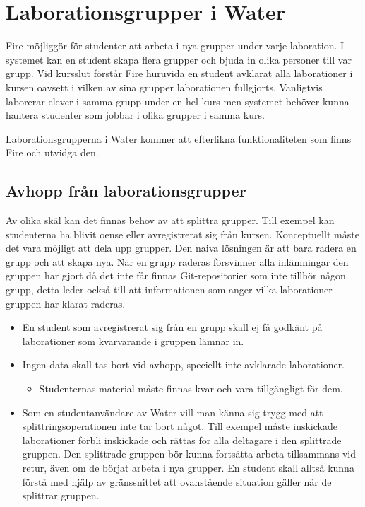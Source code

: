 \section{Laborationsgrupper i Water}

Fire möjliggör för studenter att arbeta i nya grupper under varje laboration. I systemet kan en student skapa flera grupper och bjuda in olika personer till var grupp. Vid kursslut förstår Fire huruvida en student avklarat alla laborationer i kursen oavsett i vilken av sina grupper laborationen fullgjorts. Vanligtvis laborerar elever i samma grupp under en  hel kurs men systemet behöver kunna hantera studenter som jobbar i olika grupper i samma kurs.

Laborationsgrupperna i Water kommer att efterlikna funktionaliteten som finns Fire och utvidga den.

\subsection{Avhopp från laborationsgrupper}

Av olika skäl kan det finnas behov av att splittra grupper.  Till exempel kan
studenterna ha blivit oense eller avregistrerat sig från kursen. Konceptuellt
måste det vara möjligt att dela upp grupper. Den naiva lösningen är att bara
radera en grupp och att skapa nya. När en grupp raderas försvinner alla
inlämningar den gruppen har gjort då det inte får finnas Git-repositorier som
inte tillhör någon grupp, detta leder också till att informationen som anger
vilka laborationer gruppen har klarat raderas.

\begin{itemize}
  \item En student som avregistrerat sig från en grupp skall ej få godkänt på laborationer som kvarvarande i gruppen lämnar in.
  \item Ingen data skall tas bort vid avhopp, speciellt inte avklarade laborationer.
  \begin{itemize}
    \item Studenternas material måste finnas kvar och vara tillgängligt för dem.
  \end{itemize}
  \item Som en studentanvändare av Water vill man känna sig trygg med att splittringsoperationen inte tar bort något. Till exempel måste inskickade laborationer förbli inskickade och rättas för alla deltagare i den splittrade gruppen. Den splittrade gruppen bör kunna fortsätta arbeta tillsammans vid retur, även om de börjat arbeta i nya grupper. En student skall alltså kunna förstå med hjälp av gränssnittet att ovanstående situation gäller när de splittrar gruppen.
\end{itemize}

